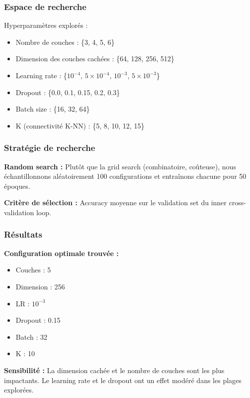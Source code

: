 \subsubsection{Espace de recherche}

Hyperparamètres explorés :
\begin{itemize}
    \item Nombre de couches : \{3, 4, 5, 6\}
    \item Dimension des couches cachées : \{64, 128, 256, 512\}
    \item Learning rate : \{$10^{-4}$, $5 \times 10^{-4}$, $10^{-3}$, $5 \times 10^{-3}$\}
    \item Dropout : \{0.0, 0.1, 0.15, 0.2, 0.3\}
    \item Batch size : \{16, 32, 64\}
    \item K (connectivité K-NN) : \{5, 8, 10, 12, 15\}
\end{itemize}

\subsubsection{Stratégie de recherche}

\textbf{Random search :}
Plutôt que la grid search (combinatoire, coûteuse), nous échantillonnons aléatoirement 100 configurations et entraînons chacune pour 50 époques.

\textbf{Critère de sélection :}
Accuracy moyenne sur le validation set du inner cross-validation loop.

\subsubsection{Résultats}

\textbf{Configuration optimale trouvée :}
\begin{itemize}
    \item Couches : 5
    \item Dimension : 256
    \item LR : $10^{-3}$
    \item Dropout : 0.15
    \item Batch : 32
    \item K : 10
\end{itemize}

\textbf{Sensibilité :}
La dimension cachée et le nombre de couches sont les plus impactants. Le learning rate et le dropout ont un effet modéré dans les plages explorées.

